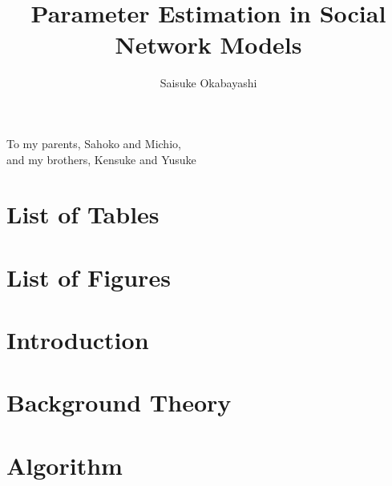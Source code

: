 \documentclass[oneside]{myumnStatThesis}
\author{Saisuke Okabayashi}
\title{Parameter Estimation in 
 Social Network Models}
\begin{document}
\maketitlepage %
\makecopyrightpage %
\frontmatter
\begin{acknowledgementspage} %
\centering
To my parents, Sahoko and Michio, \\and my brothers, Kensuke and Yusuke %
\end{acknowledgementspage}

\begin{abstract}

\end{abstract}

\tableofcontents %

\newpage
\chapter*{List of Tables}
{\def\chapter*#1{}
\listoftables}

\newpage
\chapter*{List of Figures}
{\def\chapter*#1{}
\listoffigures}


\mainmatter

\chapter{Introduction}


\chapter{Background Theory}\label{Chapter:Background}


\chapter{Algorithm}
 
\end{document}
